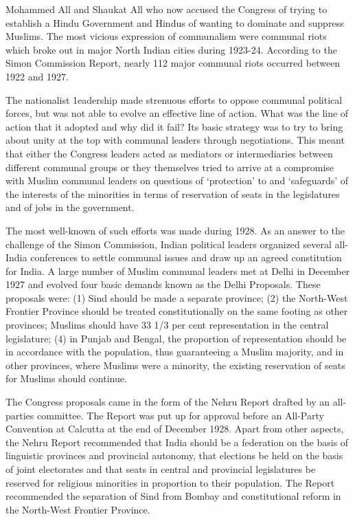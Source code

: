 Mohammed All and Shaukat All who now accused the Congress of trying to establish a Hindu Government and Hindus of wanting to dominate and suppress Muslims. The most vicious expression of communalism were communal riots which broke out in major North Indian cities during 1923-24. According to the Simon Commission Report, nearly 112 major communal riots occurred between 1922 and 1927. 

The nationalist 1eadership made strenuous efforts to oppose communal political forces, but was not able to evolve an effective line of action. What was the line of action that it adopted and why did it fail? Its basic strategy was to try to bring about unity at the top with communal leaders through negotiations. This meant that either the Congress leaders acted as mediators or intermediaries between different communal groups or they themselves tried to arrive at a compromise with Muslim communal leaders on questions of `protection' to and `safeguards' of the interests of the minorities in terms of reservation of seats in the legislatures and of jobs in the government. 

The most well-known of such efforts was made during 1928. As an answer to the challenge of the Simon Commission, Indian political leaders organized several all-India conferences to settle communal issues and draw up an agreed constitution for India. A large number of Muslim communal leaders met at Delhi in December 1927 and evolved four basic demands known as the Delhi Proposals. These proposals were: (1) Sind should be made a separate province; (2) the North-West Frontier Province should be treated constitutionally on the same footing as other provinces; Muslims should have 33 1/3 per cent representation in the central legislature; (4) in Punjab and Bengal, the proportion of representation should be in accordance with the population, thus guaranteeing a Muslim majority, and in other provinces, where Muslims were a minority, the existing reservation of seats for Muslims should continue. 

The Congress proposals came in the form of the Nehru Report drafted by an all-parties committee. The Report was put up for approval before an All-Party Convention at Calcutta at the end of December 1928. Apart from other aspects, the Nehru Report recommended that India should be a federation on the basis of linguistic provinces and provincial autonomy, that elections be held on the basis of joint electorates and that seats in central and provincial legislatures be reserved for religious minorities in proportion to their population. The Report recommended the separation of Sind from Bombay and constitutional reform in the North-West Frontier Province. 

